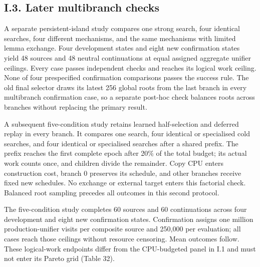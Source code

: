 \documentclass[pdflatex,sn-basic,Numbered]{sn-jnl}
\begin{document}
\subsection*{I.3. Later multibranch checks}\label{i.3.-later-multibranch-checks}

A separate persistent-island study compares one strong search, four identical searches, four different mechanisms, and the same mechanisms with limited lemma exchange. Four development states and eight new confirmation states yield 48 sources and 48 neutral continuations at equal assigned aggregate unifier ceilings. Every case passes independent checks and reaches its logical work ceiling. None of four prespecified confirmation comparisons passes the success rule. The old final selector draws its latest 256 global roots from the last branch in every multibranch confirmation case, so a separate post-hoc check balances roots across branches without replacing the primary result.

A subsequent five-condition study retains learned half-selection and deferred replay in every branch. It compares one search, four identical or specialised cold searches, and four identical or specialised searches after a shared prefix. The prefix reaches the first complete epoch after 20\% of the total budget; its actual work counts once, and children divide the remainder. Copy CPU enters construction cost, branch 0 preserves its schedule, and other branches receive fixed new schedules. No exchange or external target enters this factorial check. Balanced root sampling precedes all outcomes in this second protocol.

The five-condition study completes 60 sources and 60 continuations across four development and eight new confirmation states. Confirmation assigns one million production-unifier visits per composite source and 250,000 per evaluation; all cases reach those ceilings without resource censoring. Mean outcomes follow. These logical-work endpoints differ from the CPU-budgeted panel in I.1 and must not enter its Pareto grid (Table 32).

\begingroup
\small
\setlength{\tabcolsep}{3pt}
\renewcommand{\arraystretch}{1.13}
\end{document}
